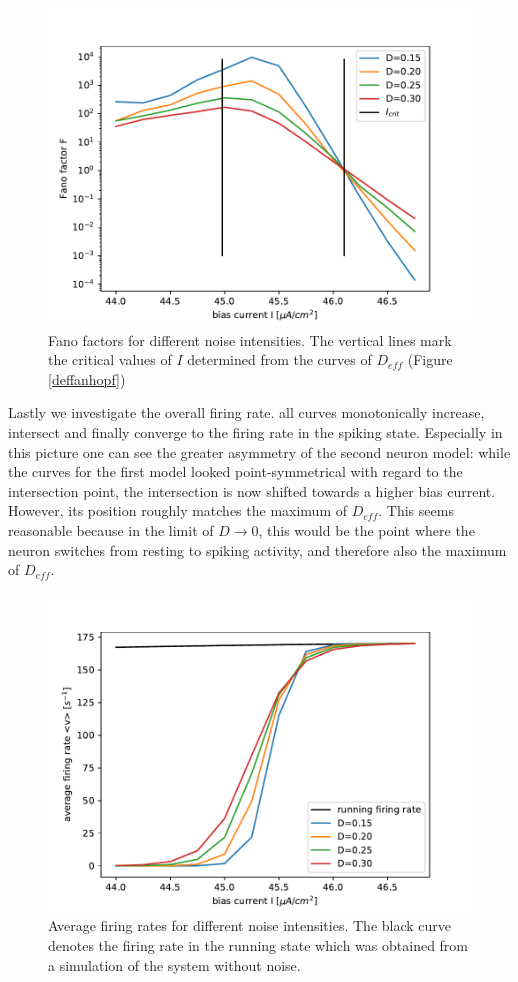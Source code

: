 \documentclass[12pt,a4paper]{article}
\begin{document}
\begin{figure}[H]
	\centering
	\includegraphics[scale=1]{fneur3critrealanhopf26flogrealanhopf19flog.pdf}\caption{Fano factors for different noise intensities. The vertical lines mark the critical values of $I$ determined from the curves of $D_{eff}$ (Figure \ref{deffanhopf})}
	\label{fanoanhopf}
\end{figure}
Lastly we investigate the overall firing rate. all curves monotonically increase, intersect and finally converge to the firing rate in the spiking state. Especially in this picture one can see the greater asymmetry of the second neuron model: while the curves for the first model looked point-symmetrical with regard to the intersection point, the intersection is now shifted towards a higher bias current. However, its position roughly matches the maximum of $D_{eff}$. This seems reasonable because in the limit of $D\rightarrow0$, this would be the point where the neuron switches from resting to spiking activity, and therefore also the maximum of $D_{eff}$.
\begin{figure}[H]
	\centering
	\includegraphics[scale=1]{gneur3critrealanhopf26flogrealanhopf19flog.pdf}\caption{Average firing rates for different noise intensities. The black curve denotes the firing rate in the running state which was obtained from a simulation of the system without noise.}
	\label{rateanhopf}
\end{figure}
\end{document}
